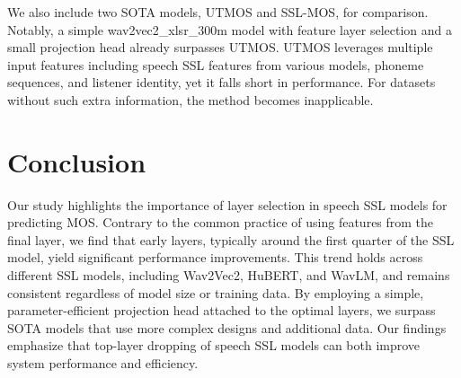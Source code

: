 \documentclass[conference]{IEEEtran}
\begin{document}
We also include two SOTA models, UTMOS and SSL-MOS, for comparison. Notably, a simple wav2vec2\_xlsr\_300m model with feature layer selection and a small projection head already surpasses UTMOS. UTMOS leverages multiple input features including speech SSL features from various models, phoneme sequences, and listener identity, yet it falls short in performance. For datasets without such extra information, the method becomes inapplicable.

\section{Conclusion}
\label{sec:conclusion}

Our study highlights the importance of layer selection in speech SSL models for predicting MOS. Contrary to the common practice of using features from the final layer, we find that early layers, typically around the first quarter of the SSL model, yield significant performance improvements. This trend holds across different SSL models, including Wav2Vec2, HuBERT, and WavLM, and remains consistent regardless of model size or training data. By employing a simple, parameter-efficient projection head attached to the optimal layers, we surpass SOTA models that use more complex designs and additional data. Our findings emphasize that top-layer dropping of speech SSL models can both improve system performance and efficiency.
\end{document}
